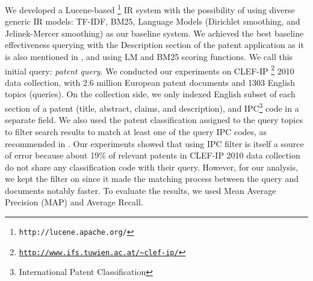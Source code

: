 We developed a Lucene-based%
\footnote{\texttt{http://lucene.apache.org/}%
} IR system with the possibility of using diverse generic IR models: TF-IDF, BM25, Language Models (Dirichlet smoothing, and Jelinek-Mercer smoothing) as our baseline system. We achieved the best baseline effectiveness querying with the Description section of the patent application as it is also mentioned in \cite{xue2009transforming}, and using LM and BM25 scoring functions. We call this initial query: {\em patent query}. We conducted our experiments on CLEF-IP%
\footnote{\texttt{\url{http://www.ifs.tuwien.ac.at/~clef-ip/}}}%
 2010 data collection, with 2.6 million European patent documents and 1303 English topics (queries). On the collection side, we only indexed English subset of each section of a patent (title, abstract, claims, and description), and IPC\footnote{International Patent Classification}%
  code in a separate field. We also used the patent classification assigned to the query topics to filter search results to match at least one of the query IPC codes, as recommended in \cite{lopez2010patatras}. Our experiments showed that using IPC filter is itself a source of error because about 19\% of relevant patents in CLEF-IP 2010 data collection do not share any classification code with their query. However, for our analysis, we kept the filter on since it made the matching process between the query and documents notably faster. To evaluate the results, we used Mean Average Precision (MAP) and Average Recall.

